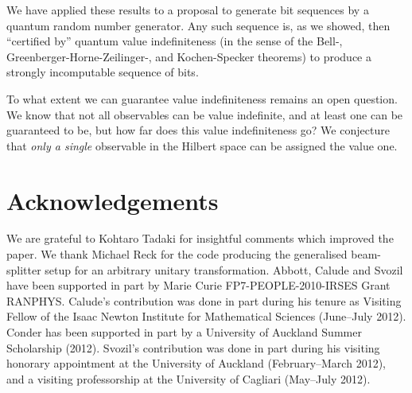 \documentclass[%
 preprint,
 showpacs,
 showkeys,
 amsmath,
 amssymb,
 aps,
 pra,
 ]{revtex4-1}
\theoremstyle{definition}
\begin{document}
We have applied these results to a proposal to generate bit sequences by
a quantum random number generator. Any such sequence is, as we showed, then ``certified by'' quantum value indefiniteness
(in the sense of the Bell-, Greenberger-Horne-Zeilinger-, and Kochen-Specker theorems) to produce a strongly incomputable sequence of bits.


To what extent we can guarantee value indefiniteness remains an open question. We know that not all observables can be value indefinite, and at least one can be guaranteed to be, but how far does this value indefiniteness go?
We conjecture that {\em only a single} observable in the Hilbert space can be assigned  the value one.
\section*{Acknowledgements}
We are grateful to Kohtaro Tadaki for insightful comments which improved the paper.
We thank Michael Reck for the code producing the generalised beam-splitter setup for an arbitrary unitary transformation.
Abbott, Calude and Svozil have been supported in part by Marie Curie FP7-PEOPLE-2010-IRSES Grant RANPHYS.
Calude's contribution was done in part during his tenure as Visiting Fellow of the Isaac Newton Institute for Mathematical Sciences (June--July 2012). Conder has been supported in part by a University of Auckland Summer Scholarship (2012).
Svozil's contribution was done in part during his visiting honorary appointment at the University of Auckland (February--March 2012),
and a visiting professorship at the University of Cagliari (May--July 2012).

%
\end{document}
